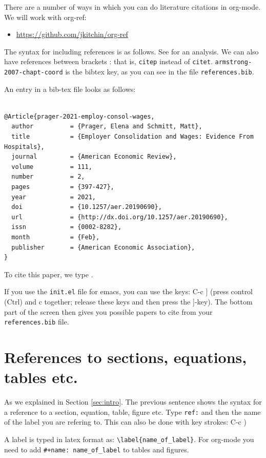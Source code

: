 \documentclass[11pt]{article}
\begin{document}
There are a number of ways in which you can do literature citations in org-mode. We will work with org-ref:
\begin{itemize}
\item \url{https://github.com/jkitchin/org-ref}
\end{itemize}

The syntax for including references is as follows. See \citet{armstrong-2007-chapt-coord} for an analysis. We can also have references between brackets \citep{athey-2019-machin-learn}: that is, \texttt{citep} instead of \texttt{citet}. \texttt{armstrong-2007-chapt-coord} is the bibtex key, as you can see in the file \texttt{references.bib}.

An entry in a bib-tex file looks as follows:

\begin{verbatim}

@Article{prager-2021-employ-consol-wages,
  author          = {Prager, Elena and Schmitt, Matt},
  title           = {Employer Consolidation and Wages: Evidence From Hospitals},
  journal         = {American Economic Review},
  volume          = 111,
  number          = 2,
  pages           = {397-427},
  year            = 2021,
  doi             = {10.1257/aer.20190690},
  url             = {http://dx.doi.org/10.1257/aer.20190690},
  issn            = {0002-8282},
  month           = {Feb},
  publisher       = {American Economic Association},
}
\end{verbatim}

To cite this paper, we type \citet{prager-2021-employ-consol-wages}.

If you use the \texttt{init.el} file for emacs, you can use the keys: C-c ] (press control (Ctrl) and c together; release these keys and then press the ]-key). The bottom part of the screen then gives you possible papers to cite from your \texttt{references.bib} file.


\section{References to sections, equations, tables etc.}
\label{sec:org6fde9b5}

As we explained in Section \ref{sec:intro}. The previous sentence shows the syntax for a reference to a section, equation, table, figure etc. Type \texttt{ref:} and then the name of the label you are refering to. This can also be done with key strokes: C-c )

A label is typed in latex format as: \texttt{\textbackslash{}label\{name\_of\_label\}}. For org-mode you need to add \texttt{\#+name: name\_of\_label} to tables and figures.
\end{document}
